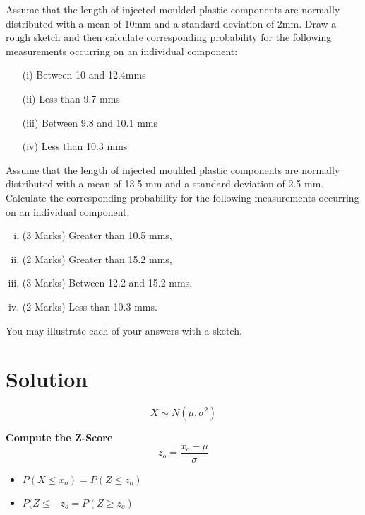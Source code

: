 


Assume that the length of injected moulded plastic components are normally distributed with a mean of 10mm and a standard deviation of 2mm.  
Draw a rough sketch and then calculate corresponding probability for the following measurements occurring on an individual component:

\begin{itemize} 
	\item[(i)]	Between 10 and 12.4mms
	\item[(ii)]	Less than 9.7 mms
	\item[(iii)]	Between 9.8 and 10.1 mms
	\item[(iv)]	Less than 10.3 mms
\end{itemize}


Assume that the length of injected moulded plastic components are normally distributed with a mean of 13.5 mm and a standard deviation of 2.5 mm.  Calculate the corresponding probability for the following measurements occurring on an individual component.

\begin{enumerate}[(i)]
\item (3 Marks)	Greater than 10.5 mms,
\item (2 Marks) Greater than 15.2 mms,
\item (3 Marks) Between 12.2 and 15.2 mms,
\item (2 Marks) Less than 10.3 mms.
\end{enumerate}
\noindent You may illustrate each of your answers with a sketch.

\section*{Solution}
\[X \sim N(\mu,\sigma^2) \]
\begin{framed}
\noindent \textbf{Compute the Z-Score}
\[ z_{o} = \frac{ x_{o} - \mu}{\sigma} \]
\end{framed}
\begin{itemize}
    \item $P(X\leq x_{o}) = P(Z \leq z_{o})$
    \item $P(Z \leq -z_{o} = P(Z \geq z_{o})$
\end{itemize}

